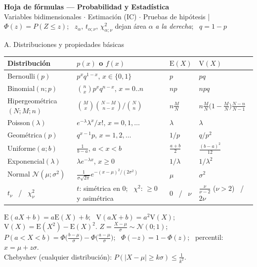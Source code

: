 \documentclass[10pt,a4paper]{extarticle}
\newcommand{\E}{\mathrm{E}}
\newcommand{\V}{\mathrm{V}}
\newcommand{\Nor}{\mathcal{N}}
\newcommand{\chis}{\chi^2}
\newcommand{\sq}[1]{\sqrt{#1}}
\begin{document}
\footnotesize
\begin{center}
{\Large\bfseries\color{azul} Hoja de fórmulas --- Probabilidad y Estadística}\\[1pt]
{\footnotesize Variables bidimensionales $\cdot$ Estimación (IC) $\cdot$ Pruebas de hipótesis \quad|\quad
$\Phi(z)=P(Z\le z)$; \ $z_\alpha,\,t_{\alpha;\nu},\,\chis_{\alpha;\nu}$ dejan área $\alpha$ \emph{a la derecha}; \ $q=1-p$}
\end{center}
\vspace{-4pt}

\begin{hoja}{A. Distribuciones y propiedades básicas}
\renewcommand{\arraystretch}{1.3}
\begin{tabular}{@{}>{\raggedright\arraybackslash}p{3.7cm}>{\raggedright\arraybackslash}p{6.6cm}>{\raggedright\arraybackslash}p{2.0cm}>{\raggedright\arraybackslash}p{5.0cm}@{}}
\toprule
\textbf{Distribución} & \textbf{$p(x)$ o $f(x)$} & $\E(X)$ & $\V(X)$\\\midrule
Bernoulli$(p)$ & $p^xq^{1-x}$, $x\in\{0,1\}$ & $p$ & $pq$\\
Binomial$(n;p)$ & $\binom nxp^xq^{n-x}$, $x=0..n$ & $np$ & $npq$\\
Hipergeométrica$(N;M;n)$ & $\binom Mx\binom{N-M}{n-x}\big/\binom Nn$ & $n\frac MN$ & $n\frac MN\big(1-\frac MN\big)\frac{N-n}{N-1}$\\
Poisson$(\lambda)$ & $e^{-\lambda}\lambda^x/x!$, $x=0,1,\dots$ & $\lambda$ & $\lambda$\\
Geométrica$(p)$ & $q^{x-1}p$, $x=1,2,\dots$ & $1/p$ & $q/p^2$\\
Uniforme$(a;b)$ & $\frac1{b-a}$, $a<x<b$ & $\frac{a+b}2$ & $\frac{(b-a)^2}{12}$\\
Exponencial$(\lambda)$ & $\lambda e^{-\lambda x}$, $x\ge0$ & $1/\lambda$ & $1/\lambda^2$\\
Normal $\Nor(\mu;\sigma^2)$ & $\frac1{\sigma\sq{2\pi}}e^{-(x-\mu)^2/(2\sigma^2)}$ & $\mu$ & $\sigma^2$\\
$t_\nu$ \ / \ $\chis_\nu$ & $t$: simétrica en 0; \ $\chis$: $\ge0$ y asimétrica & $0$ \ / \ $\nu$ & $\frac{\nu}{\nu-2}$ ($\nu>2$) \ / \ $2\nu$\\
\bottomrule
\end{tabular}

\smallskip
$\E(aX+b)=a\E(X)+b$; \ $\V(aX+b)=a^2\V(X)$; \ $\V(X)=\E(X^2)-\E(X)^2$. \quad
$Z=\frac{X-\mu}{\sigma}\sim\Nor(0;1)$; \ $P(a<X<b)=\Phi\big(\frac{b-\mu}\sigma\big)-\Phi\big(\frac{a-\mu}\sigma\big)$; \ $\Phi(-z)=1-\Phi(z)$; \ percentil: $x=\mu+z\sigma$.\\
Chebyshev (cualquier distribución): $P(|X-\mu|\ge k\sigma)\le\frac1{k^2}$.
\end{hoja}
\end{document}
